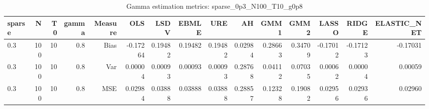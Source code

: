 \begin{table}[!htbp]\centering
\caption{Gamma estimation metrics: sparse_0p3_N100_T10_g0p8}
\label{tab:table1_sparse_0p3_N100_T10_g0p8}
\begin{tabular}{lrrrrrrrrrrrrrr}
\hline
sparse & N & T0 & gamma & Measure & OLS & LSDV & EBMLE & URE & AH & GMM1 & GMM2 & LASSO & RIDGE & ELASTIC_NET \\
\hline
0.3 & 100 & 10 & 0.8 & Bias & -0.17264 & 0.19482 & 0.19482 & 0.19482 & 0.02984 & 0.28663 & 0.34709 & -0.17012 & -0.17123 & -0.17031 \\
0.3 & 100 & 10 & 0.8 & Var & 0.00004 & 0.00093 & 0.00093 & 0.00093 & 0.28768 & 0.04112 & 0.07035 & 0.00062 & 0.00004 & 0.00059 \\
0.3 & 100 & 10 & 0.8 & MSE & 0.02984 & 0.03888 & 0.03888 & 0.03888 & 0.28857 & 0.12328 & 0.19082 & 0.02956 & 0.02936 & 0.02960 \\
\hline
\end{tabular}
\end{table}


